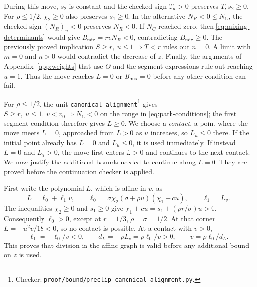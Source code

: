 \documentclass[11pt]{article}
\theoremstyle{remark}
\theoremstyle{plain}
\begin{document}
During this move, $s_2$ is constant and the checked sign $T_u>0$
preserves $T,s_2\ge0$. For $\rho\le1/2$, $\chi_2\ge0$ also
preserves $s_1\ge0$. In the alternative $N_R<0\le N_C$, the
checked sign $(N_R)_u<0$ preserves $N_R<0$. If $N_C$ reached zero,
then \eqref{eq:mixing-determinants} would give
$B_{\mathrm{mix}}=rvN_R<0$, contradicting $B_{\mathrm{mix}}\ge0$.
The previously proved implication $S\ge r,\ u\le1\Rightarrow T<r$
rules out $n=0$. A limit with $m=0$ and $n>0$ would contradict the
decrease of $z$. Finally, the arguments of Appendix~\ref{app:weights}
that use $\Theta$ and the segment expressions rule out
reaching $u=1$. Thus the move reaches $L=0$ or
$B_{\mathrm{mix}}=0$ before any other condition can fail.

For $\rho\le1/2$, the unit \nolinkurl{canonical-alignment}\footnote{Checker:
\nolinkurl{proof/bound/preclip_canonical_alignment.py}.\label{fn:checker-canonical-alignment}} gives
$S\ge r,\ u\le1,\ v<v_0\Rightarrow N_C<0$ on the range in
\eqref{eq:path-conditions}; the first segment condition therefore gives
$L\ge0$. We choose a \emph{contact}, a point where the move meets
$L=0$, approached from $L>0$ as $u$ increases,
so $L_u\le0$ there. If the initial point already has $L=0$ and
$L_u\le0$, it is used immediately. If instead $L=0$ and $L_u>0$,
the move first enters $L>0$ and continues to the next contact.
We now justify the additional bounds needed to continue along
$L=0$. They are proved before the continuation checker is applied.

First write the polynomial $L$, which is affine in $v$, as
\begin{equation}
 L=\ell_0+\ell_1v,\qquad
 \ell_0=\sigma\chi_2(\sigma+\rho u)(\chi_1+cu),\qquad \ell_1=L_v.
 \label{eq:left-affine-graph}
\end{equation}
The inequalities $\chi_2\ge0$ and $s_1\ge0$ give
$\chi_1+cu=s_1+(\rho r/\sigma)u>0$.
Consequently $\ell_0>0$, except at
$r=1/3$, $\rho=\sigma=1/2$. At that corner
$L=-u^2v/18<0$, so no contact is possible. At a contact with $v>0$,
\begin{equation}
 \ell_1=-\ell_0/v<0,\qquad
 d_L=-\rho L_v=\rho\ell_0/v>0,\qquad v=\rho\ell_0/d_L.
 \label{eq:left-graph-denominator}
\end{equation}
This proves that division in the affine graph is valid before any
additional bound on $z$ is used.
\end{document}
